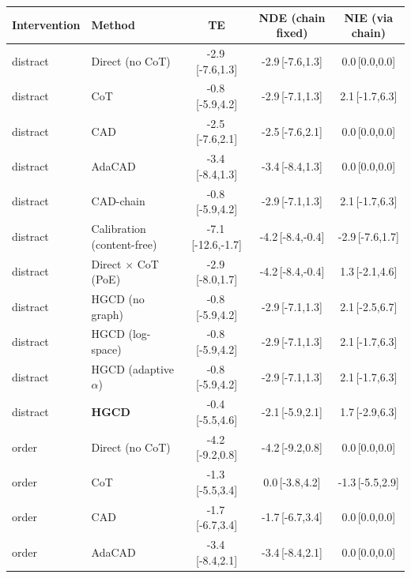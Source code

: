 \begin{tabular}{llccc}
\toprule
Intervention & Method & TE & NDE (chain fixed) & NIE (via chain) \\
\midrule
distract & Direct (no CoT) & -2.9\,{\scriptsize[-7.6,1.3]} & -2.9\,{\scriptsize[-7.6,1.3]} & 0.0\,{\scriptsize[0.0,0.0]} \\
distract & CoT & -0.8\,{\scriptsize[-5.9,4.2]} & -2.9\,{\scriptsize[-7.1,1.3]} & 2.1\,{\scriptsize[-1.7,6.3]} \\
distract & CAD & -2.5\,{\scriptsize[-7.6,2.1]} & -2.5\,{\scriptsize[-7.6,2.1]} & 0.0\,{\scriptsize[0.0,0.0]} \\
distract & AdaCAD & -3.4\,{\scriptsize[-8.4,1.3]} & -3.4\,{\scriptsize[-8.4,1.3]} & 0.0\,{\scriptsize[0.0,0.0]} \\
distract & CAD-chain & -0.8\,{\scriptsize[-5.9,4.2]} & -2.9\,{\scriptsize[-7.1,1.3]} & 2.1\,{\scriptsize[-1.7,6.3]} \\
distract & Calibration (content-free) & -7.1\,{\scriptsize[-12.6,-1.7]} & -4.2\,{\scriptsize[-8.4,-0.4]} & -2.9\,{\scriptsize[-7.6,1.7]} \\
distract & Direct $\times$ CoT (PoE) & -2.9\,{\scriptsize[-8.0,1.7]} & -4.2\,{\scriptsize[-8.4,-0.4]} & 1.3\,{\scriptsize[-2.1,4.6]} \\
distract & HGCD (no graph) & -0.8\,{\scriptsize[-5.9,4.2]} & -2.9\,{\scriptsize[-7.1,1.3]} & 2.1\,{\scriptsize[-2.5,6.7]} \\
distract & HGCD (log-space) & -0.8\,{\scriptsize[-5.9,4.2]} & -2.9\,{\scriptsize[-7.1,1.3]} & 2.1\,{\scriptsize[-1.7,6.3]} \\
distract & HGCD (adaptive $\alpha$) & -0.8\,{\scriptsize[-5.9,4.2]} & -2.9\,{\scriptsize[-7.1,1.3]} & 2.1\,{\scriptsize[-1.7,6.3]} \\
distract & \textbf{HGCD} & -0.4\,{\scriptsize[-5.5,4.6]} & -2.1\,{\scriptsize[-5.9,2.1]} & 1.7\,{\scriptsize[-2.9,6.3]} \\
\midrule
order & Direct (no CoT) & -4.2\,{\scriptsize[-9.2,0.8]} & -4.2\,{\scriptsize[-9.2,0.8]} & 0.0\,{\scriptsize[0.0,0.0]} \\
order & CoT & -1.3\,{\scriptsize[-5.5,3.4]} & 0.0\,{\scriptsize[-3.8,4.2]} & -1.3\,{\scriptsize[-5.5,2.9]} \\
order & CAD & -1.7\,{\scriptsize[-6.7,3.4]} & -1.7\,{\scriptsize[-6.7,3.4]} & 0.0\,{\scriptsize[0.0,0.0]} \\
order & AdaCAD & -3.4\,{\scriptsize[-8.4,2.1]} & -3.4\,{\scriptsize[-8.4,2.1]} & 0.0\,{\scriptsize[0.0,0.0]} \\

\end{tabular}

